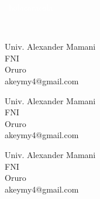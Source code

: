 \documentclass[a4paper,12pt]{article}
\newcommand{\vacio}{\textcolor{white}{holacaracola}} 			%
\begin{document}
{%

\newpage

\renewcommand{\headrulewidth}{0.5pt}
\fancyhead[L]{\vacio}

\renewcommand{\footrulewidth}{0.5pt}
\fancyfoot[C]{\vacio}														%
{}								%
\
\vacio
\

{\Huge\textbf{\thetitle}}\\												%

\vspace{1cm}
\begin{minipage}[b]{4cm}
	\begin{center}
		Univ. Alexander Mamani\\
		FNI\\
		Oruro\\
		akeymy4@gmail.com
	\end{center}
\end{minipage} \hfill \begin{minipage}[b]{4cm}
	\begin{center}
		Univ. Alexander Mamani\\
		FNI\\
		Oruro\\
		akeymy4@gmail.com
	\end{center}
\end{minipage} \hfill \begin{minipage}[b]{4cm}
	\begin{center}
		Univ. Alexander Mamani\\
		FNI\\
		Oruro\\
		akeymy4@gmail.com
	\end{center}
\end{minipage}

\vspace{2cm}

}
\end{document}
